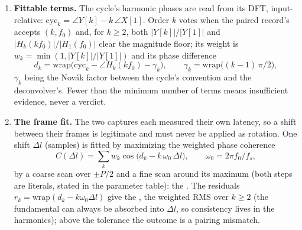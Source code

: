 \documentclass[11pt,a4paper]{article}
\begin{document}
\begin{enumerate}
\item \textbf{Fittable terms.} The cycle's harmonic phases are read from its
DFT, input-relative: $\mathrm{cyc}_k = \angle Y[k] - k\,\angle X[1]$. Order
$k$ votes when the paired record's  accepts $(k, f_0)$
and, for $k \ge 2$, both $|Y[k]|/|Y[1]|$ and $|H_k(k f_0)|/|H_1(f_0)|$
clear the magnitude floor; its weight is $w_k = \min(1, |Y[k]|/|Y[1]|)$
and its phase difference
\begin{equation}
  d_k = \mathrm{wrap}\big(\mathrm{cyc}_k - \angle H_k(k f_0) - \gamma_k\big),\qquad
  \gamma_k = \mathrm{wrap}\big((k-1)\,\pi/2\big),
  \label{eq:diff}
\end{equation}
$\gamma_k$ being the Novák factor between the cycle's convention and the
deconvolver's. Fewer than the minimum number of terms means insufficient
evidence, never a verdict.

\item \textbf{The frame fit.} The two captures each measured their own
latency, so a shift between their frames is legitimate and must never be
applied as rotation. One shift $\Delta l$ (samples) is fitted by maximizing
the weighted phase coherence
\begin{equation}
  C(\Delta l) = \sum_k w_k \cos\!\big(d_k - k\,\omega_0\,\Delta l\big),\qquad
  \omega_0 = 2\pi f_0 / f_s ,
  \label{eq:framefit}
\end{equation}
by a coarse scan over $\pm P/2$ and a fine scan around its maximum (both
steps are literals, stated in the parameter table): the .
The residuals $r_k = \mathrm{wrap}(d_k - k\omega_0\Delta l)$ give the
, the weighted RMS over $k \ge 2$ (the fundamental
can always be absorbed into $\Delta l$, so consistency lives in the
harmonics); above the tolerance the outcome is a pairing mismatch.


\end{enumerate}
\end{document}
